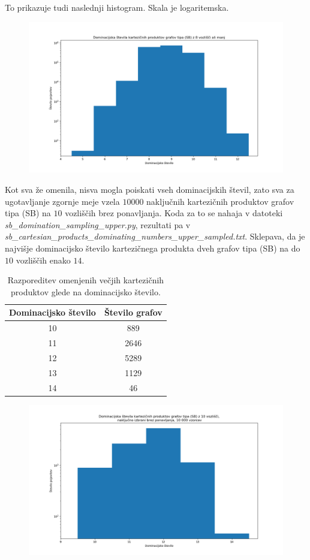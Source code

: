 \documentclass{article}
\begin{document}
To prikazuje tudi naslednji histogram. Skala je logaritemska.

\begin{figure}[h!]
    \centering
    \includegraphics[width=\textwidth]{dominacijska_spodnja.png} %
    
\end{figure}

Kot sva že omenila, nisva mogla poiskati vseh dominacijskih števil, zato sva za ugotavljanje zgornje meje vzela 
$10000$ naključnih kartezičnih produktov grafov tipa (SB) na $10$ vozliščih brez ponavljanja. Koda za to se nahaja 
v datoteki \emph{sb\_domination\_sampling\_upper.py}, rezultati pa v \emph{sb\_cartesian\_products\_dominating\_numbers\_upper\_sampled.txt}.
Sklepava, da je najvišje dominacijsko število kartezičnega produkta dveh grafov tipa (SB) na do $10$ vozliščih enako $14$.


\begin{table}[h!]
    \centering
    \begin{tabular}{|c|c|}
        \hline
        Dominacijsko število & Število grafov \\ \hline
        10 & 889 \\ \hline
        11 & 2646 \\ \hline
        12 & 5289 \\ \hline
        13 & 1129 \\ \hline
        14 & 46 \\ \hline
    \end{tabular}
    \caption{Razporeditev omenjenih večjih kartezičnih produktov glede na dominacijsko število.}
\end{table}

\begin{figure}[h!]
    \centering
    \includegraphics[width=\textwidth]{dominacijska_zgornja.png} %
    
\end{figure}
\end{document}
